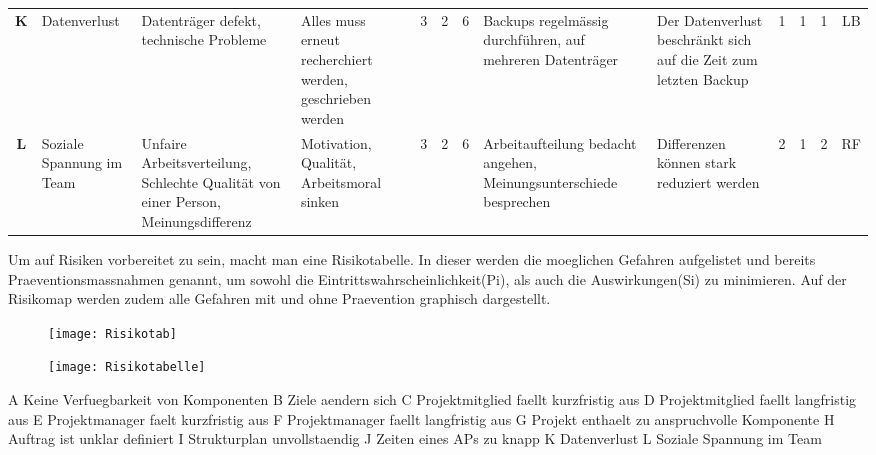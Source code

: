 \begin{table}[H]
{\begin{tabular}{c|>{\HY\RaggedRight}p{2.5cm}|>{\HY\RaggedRight}p{2.5cm}|>{\HY\RaggedRight}p{2.5cm}|c|c|c|>{\HY\RaggedRight}p{3cm}|>{\HY\RaggedRight}p{3cm}|c|c|c|c}
\textbf{K}			&Datenverlust									&Datenträger defekt, technische Probleme												&Alles muss erneut recherchiert werden, geschrieben werden		&3			&2			&\cellcolor{orange}6				&Backups regelmässig durchführen, auf mehreren Datenträger												&Der Datenverlust beschränkt sich auf die Zeit zum letzten Backup												&1				&1				&\cellcolor{dgruen}1		&LB\\
\rowcolor{grau}
\textbf{L}			&Soziale Spannung im Team						&Unfaire Arbeitsverteilung, Schlechte Qualität von einer Person, Meinungsdifferenz		&Motivation, Qualität, Arbeitsmoral sinken						&3			&2			&\cellcolor{orange}6				&Arbeitaufteilung bedacht angehen, Meinungsunterschiede besprechen										&Differenzen können stark reduziert werden																	&2				&1				&\cellcolor{hgruen}2		&RF\\
\end{tabular}
}
\end{table}


\newpage
Um auf Risiken vorbereitet zu sein, macht man eine Risikotabelle. In dieser werden die moeglichen Gefahren aufgelistet und bereits Praeventionsmassnahmen genannt, um sowohl die Eintrittswahrscheinlichkeit(Pi), als auch die Auswirkungen(Si) zu minimieren. Auf der Risikomap werden zudem alle Gefahren mit und ohne Praevention graphisch dargestellt.

\begin{figure}[H]
	\centering
	\texttt{[image: Risikotab]}
	\label{fig:Risikodiagramm}
\end{figure}

\begin{figure}[H]
	\centering
	\texttt{[image: Risikotabelle]}
	\label{fig:Tabelle}
\end{figure}
A 	Keine Verfuegbarkeit von Komponenten \newline 
B 	Ziele aendern sich\newline 
C 	Projektmitglied faellt kurzfristig aus\newline 
D	Projektmitglied faellt langfristig aus\newline 
E 	Projektmanager faelt kurzfristig aus\newline 
F 	Projektmanager faellt langfristig aus\newline 
G	Projekt enthaelt zu anspruchvolle Komponente\newline 
H	Auftrag ist unklar definiert\newline 
I	Strukturplan unvollstaendig\newline 
J	Zeiten eines APs zu knapp\newline 
K	Datenverlust\newline 
L	Soziale Spannung im Team\newline 
